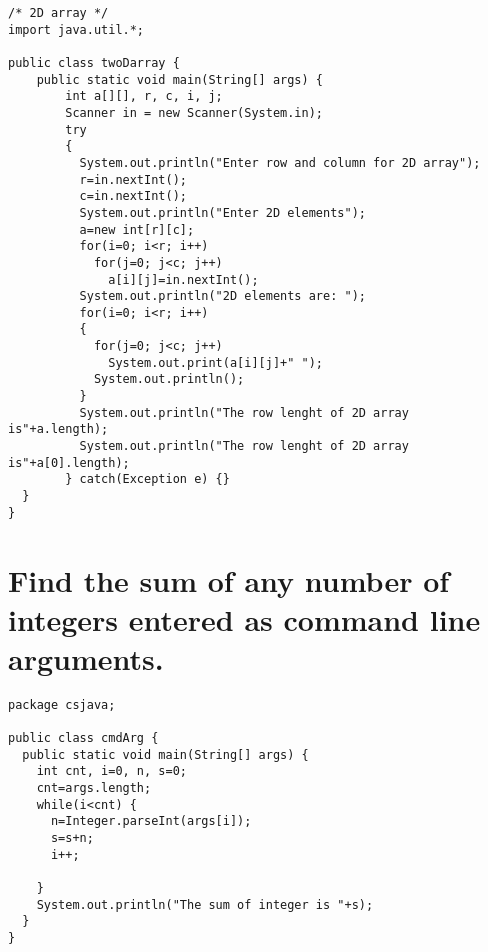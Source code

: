 \documentclass{article}
\begin{document}
{\begin{lstlisting}
/* 2D array */
import java.util.*;

public class twoDarray {
    public static void main(String[] args) {
        int a[][], r, c, i, j;
        Scanner in = new Scanner(System.in);
        try
        {
          System.out.println("Enter row and column for 2D array");
          r=in.nextInt();
          c=in.nextInt();
          System.out.println("Enter 2D elements");
          a=new int[r][c];
          for(i=0; i<r; i++)
            for(j=0; j<c; j++)
              a[i][j]=in.nextInt();
          System.out.println("2D elements are: ");
          for(i=0; i<r; i++)
          {
            for(j=0; j<c; j++)
              System.out.print(a[i][j]+" ");
            System.out.println();
          }
          System.out.println("The row lenght of 2D array is"+a.length);
          System.out.println("The row lenght of 2D array is"+a[0].length);
        } catch(Exception e) {}
  }
}
\end{lstlisting}

\section{Find the sum of any number of integers entered as command line arguments.}
\begin{lstlisting}
package csjava;

public class cmdArg {
  public static void main(String[] args) {
    int cnt, i=0, n, s=0;
    cnt=args.length;
    while(i<cnt) {
      n=Integer.parseInt(args[i]);
      s=s+n;
      i++;

    }
    System.out.println("The sum of integer is "+s);
  }
}
\end{lstlisting}

}
\end{document}
